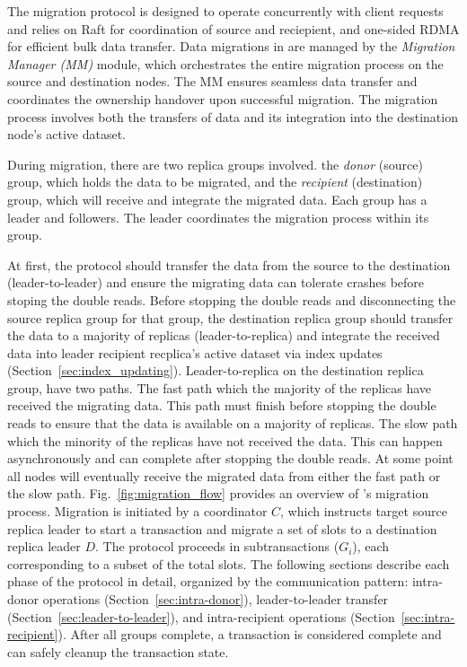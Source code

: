 The migration protocol is designed to operate concurrently with client requests and relies on Raft for coordination of source and reciepient,
and one-sided RDMA for efficient bulk data transfer.
Data migrations in \OurImplementation{} are managed by the \emph{Migration Manager (MM)} module, which orchestrates the entire migration process on the source and destination nodes.
The MM ensures seamless data transfer and coordinates the ownership handover upon successful migration.
The migration process involves both the transfers of data and its integration into the destination node’s active dataset.

During migration, there are two replica groups involved.
the \emph{donor} (source) group, which holds the data to be migrated, and the \emph{recipient} (destination) group,
which will receive and integrate the migrated data. Each group has a leader and followers. The leader coordinates the migration process within its group.

At first, the protocol should transfer the data from the source to the destination (leader-to-leader) and ensure the migrating data can tolerate crashes before stoping the double reads.
Before stopping the double reads and disconnecting the source replica group for that group, the destination replica group should transfer the data to a majority of replicas (leader-to-replica)
and integrate the received data into leader recipient recplica’s active dataset via index updates (Section~\ref{sec:index_updating}).
Leader-to-replica on the destination replica group, have two paths. The fast path which the majority of the replicas have received the migrating data. This path must finish before stopping the double reads to ensure that the data is available on a majority of replicas.
The slow path which the minority of the replicas have not received the data. This can happen asynchronously and can complete after stopping the double reads.
At some point all nodes will eventually receive the migrated data from either the fast path or the slow path.
Fig.~\ref{fig:migration_flow} provides an overview of \OurImplementation{}’s migration process.
Migration is initiated by a coordinator $C$, which instructs target source replica leader to start a transaction and migrate a set of slots to a destination replica leader $D$.
The protocol proceeds in subtransactions ($G_i$), each corresponding to a subset of the total slots.
The following sections describe each phase of the protocol in detail, organized by the communication pattern: intra-donor operations (Section~\ref{sec:intra-donor}), leader-to-leader transfer (Section~\ref{sec:leader-to-leader}), and intra-recipient operations (Section~\ref{sec:intra-recipient}).
After all groups complete, a transaction is considered complete and can safely cleanup the transaction state.

